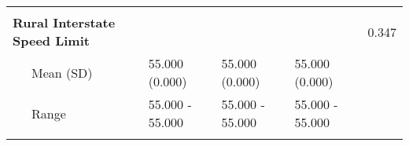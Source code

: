 \begin{longtable}[c]{@{}lllll@{}}
\begin{minipage}[t]{0.52\columnwidth}
\end{minipage}
\\\addlinespace
\begin{minipage}[t]{0.33\columnwidth}\raggedright
\textbf{Rural Interstate Speed Limit}
\end{minipage} & \begin{minipage}[t]{0.15\columnwidth}\raggedright
\end{minipage} & \begin{minipage}[t]{0.15\columnwidth}\raggedright
\end{minipage} & \begin{minipage}[t]{0.15\columnwidth}\raggedright
\end{minipage} & \begin{minipage}[t]{0.52\columnwidth}\raggedright
0.347
\end{minipage}
\\\addlinespace
\begin{minipage}[t]{0.33\columnwidth}\raggedright
~~~Mean (SD)
\end{minipage} & \begin{minipage}[t]{0.15\columnwidth}\raggedright
55.000 (0.000)
\end{minipage} & \begin{minipage}[t]{0.15\columnwidth}\raggedright
55.000 (0.000)
\end{minipage} & \begin{minipage}[t]{0.15\columnwidth}\raggedright
55.000 (0.000)
\end{minipage} & \begin{minipage}[t]{0.52\columnwidth}\raggedright
\end{minipage}
\\\addlinespace
\begin{minipage}[t]{0.33\columnwidth}\raggedright
~~~Range
\end{minipage} & \begin{minipage}[t]{0.15\columnwidth}\raggedright
55.000 - 55.000
\end{minipage} & \begin{minipage}[t]{0.15\columnwidth}\raggedright
55.000 - 55.000
\end{minipage} & \begin{minipage}[t]{0.15\columnwidth}\raggedright
55.000 - 55.000
\end{minipage} & \begin{minipage}[t]{0.52\columnwidth}\raggedright
\end{minipage}
\\\addlinespace

\end{longtable}
